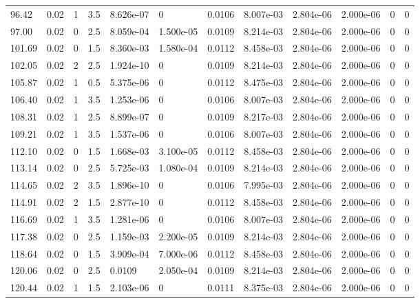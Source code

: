 \documentclass[preview]{standalone}
\begin{document}
{{{\begin{tabular}{L{1.2cm}C{1.2cm} C{0.3cm}C{0.5cm} C{1.4cm}C{1.4cm} C{1.4cm}C{1.4cm} C{1.6cm}C{1.6cm} C{1.6cm}C{1.6cm}}
  96.42  &  0.02  & 1     & 3.5 &  8.626e-07  & 0  &  0.0106&   8.007e-03& 2.804e-06 & 2.000e-06   &  0 & 0  \\ 
  97.00  &  0.02  & 0     & 2.5 &  8.059e-04  & 1.500e-05  &  0.0109&   8.214e-03& 2.804e-06 & 2.000e-06   &  0 & 0  \\ 
  101.69  &  0.02  & 0     & 1.5 &  8.360e-03  & 1.580e-04  &  0.0112&   8.458e-03& 2.804e-06 & 2.000e-06   &  0 & 0  \\ 
  102.05  &  0.02  & 2     & 2.5 &  1.924e-10  & 0  &  0.0109&   8.214e-03& 2.804e-06 & 2.000e-06   &  0 & 0  \\ 
  105.87  &  0.02  & 1     & 0.5 &  5.375e-06  & 0  &  0.0112&   8.475e-03& 2.804e-06 & 2.000e-06   &  0 & 0  \\ 
  106.40  &  0.02  & 1     & 3.5 &  1.253e-06  & 0  &  0.0106&   8.007e-03& 2.804e-06 & 2.000e-06   &  0 & 0  \\ 
  108.31  &  0.02  & 1     & 2.5 &  8.899e-07  & 0  &  0.0109&   8.217e-03& 2.804e-06 & 2.000e-06   &  0 & 0  \\ 
  109.21  &  0.02  & 1     & 3.5 &  1.537e-06  & 0  &  0.0106&   8.007e-03& 2.804e-06 & 2.000e-06   &  0 & 0  \\ 
  112.10  &  0.02  & 0     & 1.5 &  1.668e-03  & 3.100e-05  &  0.0112&   8.458e-03& 2.804e-06 & 2.000e-06   &  0 & 0  \\ 
  113.14  &  0.02  & 0     & 2.5 &  5.725e-03  & 1.080e-04  &  0.0109&   8.214e-03& 2.804e-06 & 2.000e-06   &  0 & 0  \\ 
  114.65  &  0.02  & 2     & 3.5 &  1.896e-10  & 0  &  0.0106&   7.995e-03& 2.804e-06 & 2.000e-06   &  0 & 0  \\ 
  114.91  &  0.02  & 2     & 1.5 &  2.877e-10  & 0  &  0.0112&   8.458e-03& 2.804e-06 & 2.000e-06   &  0 & 0  \\ 
  116.69  &  0.02  & 1     & 3.5 &  1.281e-06  & 0  &  0.0106&   8.007e-03& 2.804e-06 & 2.000e-06   &  0 & 0  \\ 
  117.38  &  0.02  & 0     & 2.5 &  1.159e-03  & 2.200e-05  &  0.0109&   8.214e-03& 2.804e-06 & 2.000e-06   &  0 & 0  \\ 
  118.64  &  0.02  & 0     & 1.5 &  3.909e-04  & 7.000e-06  &  0.0112&   8.458e-03& 2.804e-06 & 2.000e-06   &  0 & 0  \\ 
  120.06  &  0.02  & 0     & 2.5 &  0.0109  & 2.050e-04  &  0.0109&   8.214e-03& 2.804e-06 & 2.000e-06   &  0 & 0  \\ 
  120.44  &  0.02  & 1     & 1.5 &  2.103e-06  & 0  &  0.0111&   8.375e-03& 2.804e-06 & 2.000e-06   &  0 & 0  \\ 

\end{tabular}}}}
\end{document}

